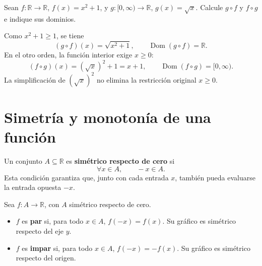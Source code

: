 \begin{ejemplo}
Sean $f:\mathbb{R}\to\mathbb{R}$, $f(x)=x^2+1$, y $g:[0,\infty)\to\mathbb{R}$, $g(x)=\sqrt{x}$. Calcule $g\circ f$ y $f\circ g$ e indique sus dominios.
\end{ejemplo}
\ifmostrarSoluciones
\begin{solucion}
Como $x^2+1\geq1$, se tiene
\[
(g\circ f)(x)=\sqrt{x^2+1},\qquad
\operatorname{Dom}(g\circ f)=\mathbb{R}.
\]
En el otro orden, la función interior exige $x\geq0$:
\[
(f\circ g)(x)=(\sqrt{x})^2+1=x+1,\qquad
\operatorname{Dom}(f\circ g)=[0,\infty).
\]
La simplificación de $(\sqrt{x})^2$ no elimina la restricción original $x\geq0$.
\end{solucion}
\else\vspace{15mm}\fi

\section*{Simetría y monotonía de una función}

\begin{definicion}
Un conjunto $A\subseteq\mathbb{R}$ es \textbf{simétrico respecto de cero} si
\[
\forall x\in A,\qquad -x\in A.
\]
Esta condición garantiza que, junto con cada entrada $x$, también pueda evaluarse la entrada opuesta $-x$.
\end{definicion}

\begin{definicion}
Sea $f:A\to\mathbb{R}$, con $A$ simétrico respecto de cero.
\begin{itemize}
  \item $f$ es \textbf{par} si, para todo $x\in A$, $f(-x)=f(x)$. Su gráfico es simétrico respecto del eje $y$.
  \item $f$ es \textbf{impar} si, para todo $x\in A$, $f(-x)=-f(x)$. Su gráfico es simétrico respecto del origen.
\end{itemize}
\end{definicion}

